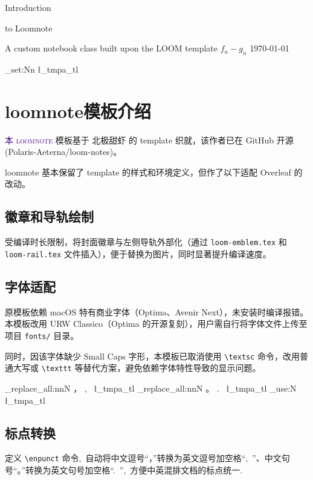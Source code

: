 \documentclass[cjk]{loomnote}
\newcommand{\enpunct}[1]{%
  \tl_set:Nn \l_tmpa_tl {#1}
  \regex_replace_all:nnN {，} {,\ } \l_tmpa_tl %
  \regex_replace_all:nnN {。} {.\ } \l_tmpa_tl %
  \tl_use:N \l_tmpa_tl
}
\begin{document}
\loomcover
  {Introduction \par to Loomnote}
  {A custom notebook class built upon the LOOM template}
  {$f_n-g_n$}
  {\today}

\enablerail

\newpage

{\small\tableofcontents}

\clearpage

\enpunct{

\section{loomnote模板介绍}

\textcolor{indigo}{本 \textsc{loomnote}} 模板基于 \textcolor{madder}{北极甜虾} 的 \textcolor{weld}{\text{LOOM} template} 织就，该作者已在 \textcolor{madder}{GitHub} 开源 \textcolor{selvage}{(Polaris-Aeterna/loom-notes)}。

loomnote 基本保留了 \textcolor{weld}{\text{LOOM} template} 的样式和环境定义，但作了以下适配 \textcolor{selvage}{Overleaf} 的改动。

\subsection{徽章和导轨绘制}

受编译时长限制，将封面徽章与左侧导轨外部化（通过 \texttt{loom-emblem.tex} 和 \texttt{loom-rail.tex} 文件插入），便于替换为图片，同时显著提升编译速度。

\subsection{字体适配}

原模板依赖 macOS 特有商业字体（Optima、Avenir Next），未安装时编译报错。本模板改用 URW Classico（Optima 的开源复刻），用户需自行将字体文件上传至项目 \texttt{fonts/} 目录。

同时，因该字体缺少 Small Caps 字形，本模板已取消使用 \texttt{\textbackslash textsc} 命令，改用普通大写或 \texttt{\textbackslash texttt} 等替代方案，避免依赖字体特性导致的显示问题。

}

\subsection{标点转换}

定义 \texttt{\textbackslash enpunct} 命令,\ 自动将中文逗号“，”转换为英文逗号加空格“,\ ”、中文句号“。”转换为英文句号加空格“.\ ”,\ 方便中英混排文档的标点统一.
\end{document}
